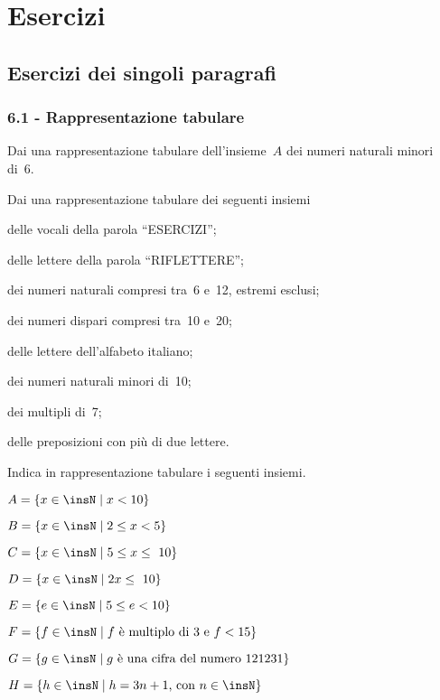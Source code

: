\section{Esercizi}
\subsection{Esercizi dei singoli paragrafi}
\subsubsection*{6.1 - Rappresentazione tabulare}

\begin{esercizio}
\label{ese:6.1}
Dai una rappresentazione tabulare dell'insieme~$A$ dei numeri naturali minori di~6.
\end{esercizio}

\begin{esercizio}
\label{ese:6.2}
Dai una rappresentazione tabulare dei seguenti insiemi
\begin{enumeratea}
 \item delle vocali della parola ``ESERCIZI'';
 \item delle lettere della parola ``RIFLETTERE'';
 \item dei numeri naturali compresi tra~6 e~12, estremi esclusi;
 \item dei numeri dispari compresi tra~10 e~20;
 \item delle lettere dell'alfabeto italiano;
 \item dei numeri naturali minori di~10;
 \item dei multipli di~7;
 \item delle preposizioni con più di due lettere.
\end{enumeratea}
\end{esercizio}

\begin{esercizio}
 \label{ese:6.3}
Indica in rappresentazione tabulare i seguenti insiemi.
\TabPositions{7.5cm}
\begin{enumeratea}
 \item $A=\{x\in\insN\mid x<10\}$\tab\dotfill
 \item $B=\{x\in\insN\mid 2\le x<5\}$\tab\dotfill
 \item $C=\{x\in\insN\mid 5\le x\le~10\}$\tab\dotfill
 \item $D=\{x\in\insN\mid 2x\le~10\}$ \tab\dotfill
 \item $E=\{e\in\insN\mid 5\le e<10\}$\tab\dotfill
 \item $F=\{f\in\insN\mid f\text{ è multiplo di~3 e } f<15\}$\tab\dotfill
 \item $G=\{g\in\insN\mid g\text{ è una cifra del numero }121231\}$\tab\dotfill
 \item $H=\{h\in\insN\mid h=3n+1\text{, con }n\in\insN\}$\tab\dotfill
\end{enumeratea}
\end{esercizio}

